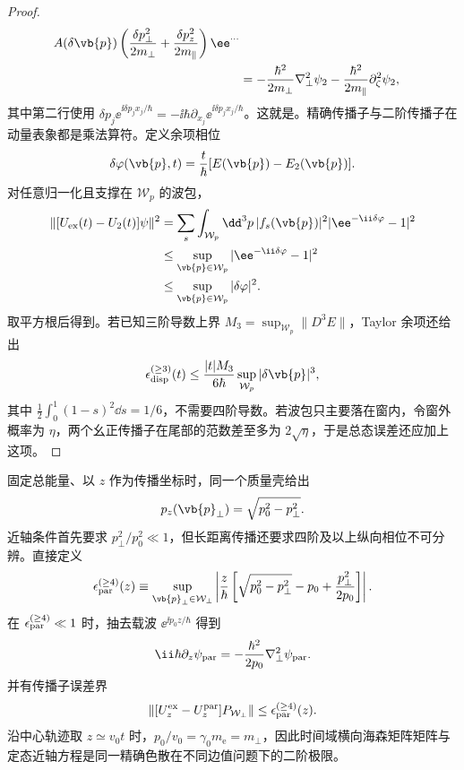 \begin{proof}
\begin{align*}
A(\delta\vb{p})
\left(\frac{\delta p_\perp^2}{2m_\perp}
+\frac{\delta p_z^2}{2m_\parallel}\right)\ee^{\cdots}\\
&=-\frac{\hbar^2}{2m_\perp}\nabla_\perp^2\psi_2
-\frac{\hbar^2}{2m_\parallel}\partial_\zeta^2\psi_2,
\end{align*}
其中第二行使用 $\delta p_j \ee^{\ii\delta p_jx_j/\hbar}=-\ii\hbar\partial_{x_j}\ee^{\ii\delta p_jx_j/\hbar}$。这就是。精确传播子与二阶传播子在动量表象都是乘法算符。定义余项相位
\begin{equation*}
\delta\varphi(\vb{p},t)
=\frac{t}{\hbar}[E(\vb{p})-E_2(\vb{p})].
\end{equation*}
对任意归一化且支撑在 $\mathcal W_p$ 的波包，
\begin{align*}
\|[U_{\rm ex}(t)-U_2(t)]\psi\|^2
&=\sum_s\int_{\mathcal W_p}\dd^3 p\,|f_s(\vb{p})|^2
|\ee^{-\ii\delta\varphi}-1|^2\\
&\le\sup_{\vb{p}\in\mathcal W_p}|\ee^{-\ii\delta\varphi}-1|^2\\
&\le\sup_{\vb{p}\in\mathcal W_p}|\delta\varphi|^2.
\end{align*}
取平方根后得到。若已知三阶导数上界 $M_3=\sup_{\mathcal W_p}\|D^3E\|$，Taylor 余项还给出
\begin{equation*}
\epsilon_{\rm disp}^{(\ge3)}(t)
\le\frac{|t|M_3}{6\hbar}
\sup_{\mathcal W_p}|\delta\vb{p}|^3,
\end{equation*}
其中 $\frac12\int_0^1(1-s)^2\dd s=1/6$，不需要四阶导数。若波包只主要落在窗内，令窗外概率为 $\eta$，两个幺正传播子在尾部的范数差至多为 $2\sqrt\eta$，于是总态误差还应加上这项。
\end{proof}


固定总能量、以 $z$ 作为传播坐标时，同一个质量壳给出
\begin{equation*}
p_z(\vb{p}_\perp)=\sqrt{p_0^2-p_\perp^2}.
\end{equation*}
近轴条件首先要求 $p_\perp^2/p_0^2\ll1$，但长距离传播还要求四阶及以上纵向相位不可分辨。直接定义
\begin{equation}
{
\epsilon_{\rm par}^{(\ge4)}(z)
\equiv
\sup_{\vb{p}_\perp\in\mathcal W_\perp}
\left|\frac{z}{\hbar}
\left[\sqrt{p_0^2-p_\perp^2}-p_0+\frac{p_\perp^2}{2p_0}\right]\right|.}
\label{eq:paraxial_phase_control_parameter}
\end{equation}
在 $\epsilon_{\rm par}^{(\ge4)}\ll1$ 时，抽去载波 $\ee^{\ii p_0z/\hbar}$ 得到
\begin{equation}
{
\ii\hbar\partial_z\psi_{\rm par}
=-\frac{\hbar^2}{2p_0}\nabla_\perp^2\psi_{\rm par}.}
\label{eq:relativistic_paraxial_from_mass_shell}
\end{equation}
并有传播子误差界
\begin{equation}
{
\left\|[U_z^{\rm ex}-U_z^{\rm par}]P_{\mathcal W_\perp}\right\|
\le\epsilon_{\rm par}^{(\ge4)}(z).}
\label{eq:paraxial_propagator_error_bound}
\end{equation}
沿中心轨迹取 $z\simeq v_0t$ 时，$p_0/v_0=\gamma_0m_{\mathrm e}=m_\perp$，因此时间域横向海森矩阵矩阵与定态近轴方程是同一精确色散在不同边值问题下的二阶极限。


